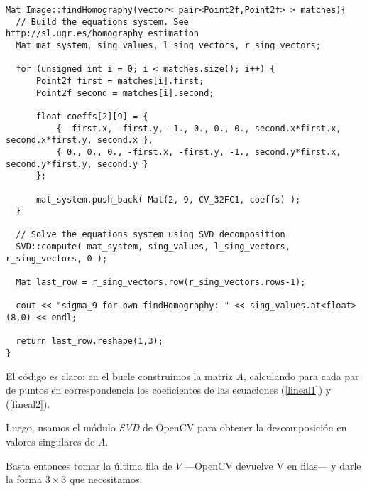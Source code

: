 \documentclass[a4paper, 11pt]{article}
\theoremstyle{definition}
\theoremstyle{theorem}
\begin{document}
  \begin{lstlisting}
Mat Image::findHomography(vector< pair<Point2f,Point2f> > matches){
  // Build the equations system. See http://sl.ugr.es/homography_estimation
  Mat mat_system, sing_values, l_sing_vectors, r_sing_vectors;

  for (unsigned int i = 0; i < matches.size(); i++) {
      Point2f first = matches[i].first;
      Point2f second = matches[i].second;

      float coeffs[2][9] = {
          { -first.x, -first.y, -1., 0., 0., 0., second.x*first.x, second.x*first.y, second.x },
          { 0., 0., 0., -first.x, -first.y, -1., second.y*first.x, second.y*first.y, second.y }
      };

      mat_system.push_back( Mat(2, 9, CV_32FC1, coeffs) );
  }

  // Solve the equations system using SVD decomposition
  SVD::compute( mat_system, sing_values, l_sing_vectors, r_sing_vectors, 0 );

  Mat last_row = r_sing_vectors.row(r_sing_vectors.rows-1);

  cout << "sigma_9 for own findHomography: " << sing_values.at<float>(8,0) << endl;

  return last_row.reshape(1,3);
}
  \end{lstlisting}

  El código es claro: en el bucle construimos la matriz $A$, calculando para cada par de puntos en correspondencia los coeficientes de las ecuaciones (\ref{lineal1}) y (\ref{lineal2}).

  Luego, usamos el módulo \emph{SVD} de OpenCV para obtener la descomposición en valores singulares de $A$.

  Basta entonces tomar la última fila de $V$ ---OpenCV devuelve V en filas--- y darle la forma $3\times3$ que necesitamos.
\end{document}
